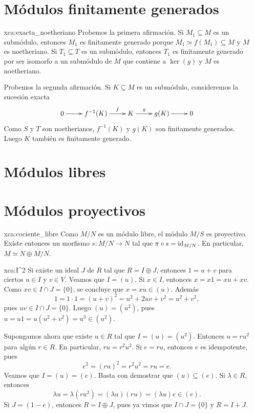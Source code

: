 \section*{Módulos finitamente generados}

\begin{sol}{xca:exacta_noetheriano}
	Probemos la primera afirmación. Si $M_1\subseteq M$ es un submódulo, entonces
	$M_1$ es finitamente generado porque $M_1\simeq f(M_1)\subseteq M$ y $M$ es
	noetheriano. Si $T_1\subseteq T$ es un submódulo, entonces $T_1$ es
	finitamente generado por ser isomorfo a un submódulo de $M$ que
	contiene a $\ker(g)$ y $M$ es noetheriano.

	Probemos la segunda afirmación. Si $K\subseteq M$ es un submódulo,
	consideremos la sucesión exacta
	\[
		\xymatrix{
		0\ar[r] 
		& f^{-1}(K)
		\ar[r]^-{f}
		& K
		\ar[r]^-{g}
		& g(K)\ar[r]
		& 0
		}
	\]
	Como $S$ y $T$ son noetherianos, $f^{-1}(K)$ y $g(K)$ son finitamente
	generados. Luego $K$ también es finitamente
	generado.
\end{sol}

\section*{Módulos libres}

\section*{Módulos proyectivos}

\begin{sol}{xca:cociente_libre}
Como $M/N$ es un módulo libre, el módulo $M/S$ es proyectivo. Existe entonces un morfismo $s\colon M/N\to N$ tal 
que $\pi\circ s=\operatorname{id}_{M/N}$. En particular, $M\simeq N\oplus M/N$. 	
\end{sol}

\begin{sol}{xca:I^2}
Si existe un ideal $J$ de $R$ tal que $R=I\oplus J$, entonces $1=u+v$ para ciertos $u\in I$ y $v\in V$. Veamos que $I=(u)$. Si $x\in I$,
entonces $x=x1=xu+xv$. Como $xv\in I\cap J=\{0\}$, se concluye que $x=xu\in (u)$. Además 
\[
1=1\cdot 1=(u+v)^2=u^2+2uv+v^2=u^2+v^2,
\]
pues $uv\in I\cap J=\{0\}$. Luego $(u)=(u^2)$, pues $u=u1=u(u^2+v^2)=u^3\in (u^2)$.  

Supongamos ahora que existe $u\in R$ tal que $I=(u)=(u^2)$. Entonces $u=ru^2$ para algún $r\in R$. En particular, 
$ru=r^2u^2$. Si  
$e=ru$, entonces $e$ es idempotente, pues
\[
e^2=(ru)^2=r^2u^2=ru=e.
\]
Veamos que $I=(u)=(e)$. Basta con demostrar que $(u)\subseteq (e)$. 
Si $\lambda\in R$, entonces 
\[
\lambda u=\lambda(ru^2)=(\lambda u)(ru)=(\lambda u)e\in (e).
\]
Si $J=(1-e)$, entonces $R=I\oplus J$, pues ya vimos que
$I\cap J=\{0\}$ y $R=I+J$.  	
\end{sol}

